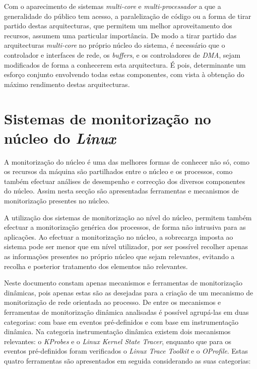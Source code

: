 Com o aparecimento de sistemas \textit{multi-core} e \textit{multi-processador} a que a generalidade do público tem acesso, a paralelização de código ou a forma de tirar partido destas arquitecturas, que permitem um melhor aproveitamento dos recursos, assumem uma particular importância.
De modo a tirar partido das arquitecturas \textit{multi-core} no próprio núcleo do sistema, é necessário que o controlador e interfaces de rede, os \textit{buffers}, e os controladores de \textit{DMA}, sejam modificados de forma a conhecerem esta arquitectura.
É pois, determinante um esforço conjunto envolvendo todas estas componentes, com vista à obtenção do máximo rendimento destas arquitecturas\cite{Deri:2010}.



\section{Sistemas de monitorização no núcleo do \textit{Linux}}\label{sect:instrumentacao_casos_linux}

A monitorização do núcleo é uma das melhores formas de conhecer não só, como os recursos da máquina são partilhados entre o núcleo e os processos, como também efectuar análises de desempenho e correcção dos diversos componentes do núcleo.
Assim nesta secção são apresentadas ferramentas e mecanismos de monitorização presentes no núcleo.

A utilização dos sistemas de monitorização ao nível do núcleo, permitem também efectuar a monitorização genérica dos processos, de forma não intrusiva para as aplicações.
Ao efectuar a monitorização no núcleo, a sobrecarga imposta ao sistema pode ser menor que em nível utilizador, por ser possível recolher apenas as informações presentes no próprio núcleo que sejam relevantes, evitando a recolha e posterior tratamento dos elementos não relevantes.

Neste documento constam apenas mecanismos e ferramentas de monitorização dinâmicas, pois apenas estas são as desejadas para a criação de um mecanismo de monitorização de rede orientada ao processo.
De entre os mecanismos e ferramentas de monitorização dinâmica analisadas é possível agrupá-las em duas categorias: com base em eventos pré-definidos e com base em instrumentação dinâmica.
Na categoria instrumentação dinâmica existem dois mecanismos relevantes: o \textit{KProbes} e o \textit{Linux Kernel State Tracer}, enquanto que para os eventos pré-definidos foram verificados o \textit{Linux Trace Toolkit} e o \textit{OProfile}.
Estas quatro ferramentas são apresentados em seguida considerando as suas categorias:

